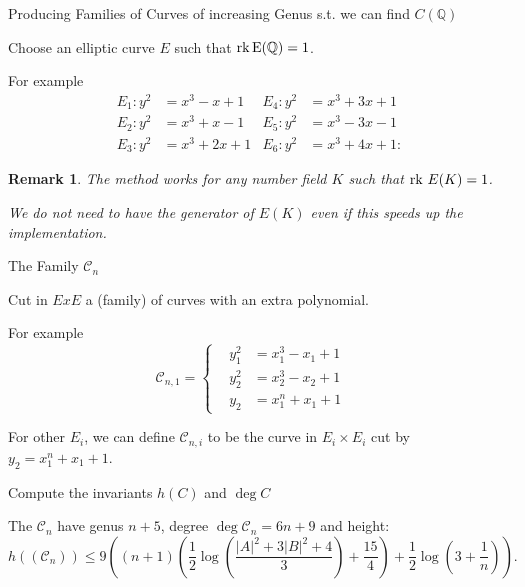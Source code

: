 \documentclass[12pt]{beamer}
\newcommand{\Ci}{\mathcal{C}}
\newtheorem{remark}{Remark}
\begin{document}
\begin{frame}{Producing Families of Curves of increasing Genus s.t. we can find $C(\mathbb{Q})$}

\begin{alertblock} {Choose an elliptic curve $E$  such that $\rm{rk} \,E({\mathbb{Q}})=1$. }\end{alertblock}

 For example
\[
		\begin{aligned}
			E_1 \colon y^2 &= x^3 - x + 1 & E_4 \colon y^2 &= x^3 + 3 x + 1 \\
			E_2 \colon y^2 &= x^3 + x - 1 & E_5 \colon y^2 &= x^3 - 3 x - 1 \\
			E_3 \colon y^2 &= x^3 + 2 x + 1 & E_6 \colon y^2 &= x^3 + 4 x + 1 \colon 
		\end{aligned}
	\]


\begin{remark}
The method works for any number field $K$ such that ${\rm{rk} }\,\,E(K)=1$.

 We do not need to have the generator of $E(K)$ even if this speeds up the implementation.
\end{remark}
\end{frame}
\begin{frame}{The Family $\Ci_n$}
\begin{alertblock}{
Cut in $ExE$ a (family) of curves with an extra polynomial.}
\end{alertblock}


For example
\begin{equation*}
\mathcal{C}_{n,1}=\begin{cases}
\,\,\,\,\,y_1^2&=x_1^3-x_1+1\,\,\,\,\,\,\,\,\\
\,\,\,\,\,y_2^2&=x_2^3-x_2+1\,\,\,\,\,\,\,\,\\
\,\,\,\,\,y_2&=x_1^n+x_1+1
\end{cases}
\end{equation*}

\pause
For other $E_i$, we can define  $\mathcal{C}_{n,i}$ to be the curve in $E_i\times E_i$ cut by $y_2=x_1^n+x_1+1$.
\pause
\begin{alertblock}{Compute the invariants $h(C)$ and $\deg C$}
\end{alertblock}
The $\Ci_n$ have genus $n+5$, degree $\deg \Ci_n= 6n+9$ and height:
\[
	h((\mathcal{C}_n)) \leq 9 \left((n+1) \left( \frac{1}{2} \log\left( \frac{\lvert A \rvert^2 + 3 \lvert B \rvert^2 + 4}{3} \right) + \frac{15}{4} \right) + \frac{1}{2} \log\left( 3 + \frac{1}{n} \right) \right).
	\]

\end{frame}
\end{document}
